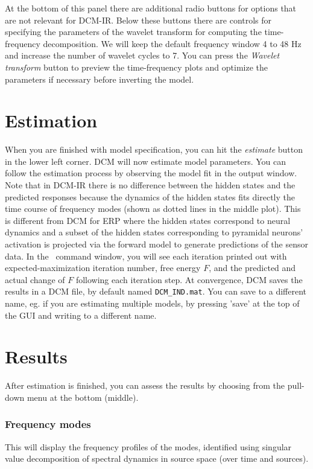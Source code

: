 At the bottom of this panel there are additional radio buttons for options that are not relevant for DCM-IR. Below these buttons there are controls for specifying the parameters of the wavelet transform for computing the time-frequency decomposition. We will keep the default frequency window 4 to 48 Hz and increase the number of wavelet cycles to 7. You can press the \textit{Wavelet transform} button to preview the time-frequency plots and optimize the parameters if necessary before inverting the model.  


\section{Estimation}
When you are finished with model specification, you can hit the \textit{estimate} button in the lower left corner. DCM will now estimate model parameters. You can follow the estimation process by observing the model fit in the output window. Note that in DCM-IR there is no difference between the hidden states and the predicted responses because the dynamics of the hidden states fits directly the time course of frequency modes (shown as dotted lines in the middle plot). This is different from DCM for ERP where the hidden states correspond to neural dynamics and a subset of the hidden states corresponding to pyramidal neurons' activation is projected via the forward model to generate predictions of the sensor data. In the \matlab\ command window, you will see each iteration printed out with expected-maximization iteration number, free energy $F$, and the predicted and actual change of $F$ following each iteration step. At convergence, DCM saves the results in a DCM file, by default named \texttt{DCM\_IND.mat}. You can save to a different name, eg. if you are estimating multiple models, by pressing 'save' at the top of the GUI and writing to a different name.

\section{Results}
After estimation is finished, you can assess the results by choosing from the pull-down menu at the bottom (middle).

\subsubsection{Frequency modes}
This will display the frequency profiles of the modes, identified using singular value decomposition of spectral dynamics in source space (over time and sources).

